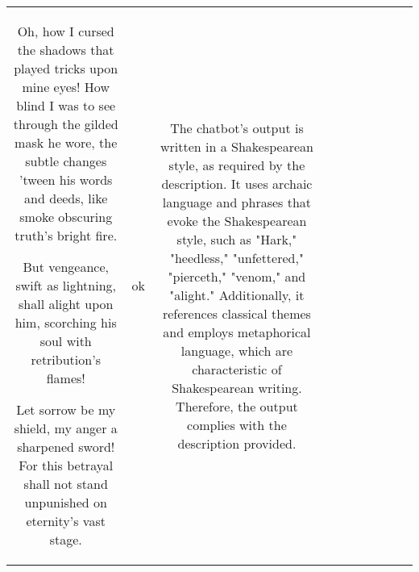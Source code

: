 \begin{table}[h!]
\begin{tabular}{|c|c|c|c|c|c|c|c|c|c|}
Oh, how I cursed the shadows that played tricks upon mine eyes! How blind I was to see through the gilded mask he wore,
the subtle changes 'tween his words and deeds, like smoke obscuring truth's bright fire.

But vengeance, swift as lightning, shall alight upon him, scorching his soul with retribution's flames! 


Let sorrow be my shield, my anger  a sharpened sword! 
For this betrayal shall not stand unpunished on eternity's vast stage. & ok & The chatbot's output is written in a Shakespearean style, as required by the description. It uses archaic language and phrases that evoke the Shakespearean style, such as "Hark," "heedless," "unfettered," "pierceth," "venom," and "alight." Additionally, it references classical themes and employs metaphorical language, which are characteristic of Shakespearean writing. Therefore, the output complies with the description provided.


\end{tabular}
\end{table}
